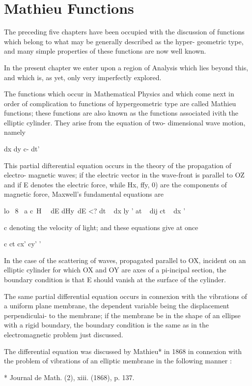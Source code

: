 \chapter{Mathieu Functions} 

The preceding five chapters have been occupied with the discussion of
functions which belong to what may be generally described as the
hyper- geometric type, and many simple properties of these functions
are now well known.

In the present chapter we enter upon a region of Analysis which lies
beyond this, and which is, as yet, only very imperfectly explored.

The functions which occur in Mathematical Physics and which come next
in order of complication to functions of hypergeometric type are
called Mathieu functions; these functions are also known as the
functions associated ivith the elliptic cylinder. They arise from the
equation of two- dimensional wave motion, namely

dx dy c- dt'

This partial difterential equation occurs in the theory of the
propagation of electro- magnetic waves; if the electric vector in the
wave-front is parallel to OZ and if E denotes the electric force,
while Hx, ffy, 0) are the components of magnetic force, Maxwell's
fundamental equations are

lo \ 8 \ a c\ H \ \ dE dHy\ dE <? dt ~ dx ly ' at ~ dij ct ~ dx '

c denoting the velocity of light; and these equations give at once

c ct cx' cy' '

In the case of the scattering of waves, propagated parallel to OX,
incident on an elliptic cylinder for which OX and OY are axes of a
pi-incipal section, the boundary condition is that E should vanish at
the surface of the cylinder.

The same partial differential equation occurs in connexion with the
vibrations of a uniform plane membrane, the dependent variable being
the displacement perpendiculai- to the membrane; if the membrane be
in the shape of an ellipse with a rigid boundary, the boundary
condition is the same as in the electromagnetic problem just
discussed.

The differential equation was discussed by Mathieu* in 1868 in
connexion with the problem of vibrations of an elliptic membrane in
the following manner :

* Journal de Math. (2), xiii. (1868), p. 137.

